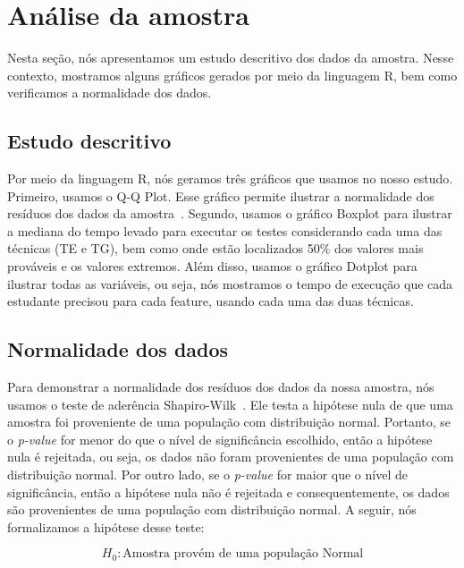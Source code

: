 \section{An\'alise da amostra}
\label{sec:analise}

Nesta seção, nós apresentamos um estudo descritivo dos dados da amostra. Nesse contexto, mostramos alguns gráficos gerados por meio da linguagem R, bem como verificamos a normalidade dos dados.

\subsection{Estudo descritivo}
\label{sec:estudo}

Por meio da linguagem R, nós geramos três gráficos que usamos no nosso estudo. Primeiro, usamos o Q-Q Plot. Esse gráfico permite ilustrar a normalidade dos resíduos dos dados da amostra~\cite{Wilk1968}. Segundo, usamos o gráfico Boxplot para ilustrar a mediana do tempo levado para executar os testes considerando cada uma das técnicas (TE e TG), bem como onde estão localizados 50\% dos valores mais prováveis e os valores extremos. Além disso, usamos o gráfico Dotplot para ilustrar todas as variáveis, ou seja, nós mostramos o tempo de execução que cada estudante precisou para cada feature, usando cada uma das duas técnicas.

\subsection{Normalidade dos dados}
\label{sec:normalidade}

Para demonstrar a normalidade dos resíduos dos dados da nossa amostra, nós usamos o teste de aderência Shapiro-Wilk~\cite{shapirowilk}. Ele testa a hipótese nula de que uma amostra foi proveniente de uma população com distribuição normal. Portanto, se o \emph{p-value} for menor do que o nível de significância escolhido, então a hipótese nula é rejeitada, ou seja, os dados não foram provenientes de uma população com distribuição normal. Por outro lado, se o \emph{p-value} for maior que o nível de significância, então a hipótese nula não é rejeitada e consequentemente, os dados são provenientes de uma população com distribuição normal. A seguir, nós formalizamos a hipótese desse teste:

\footnotesize
\begin{equation}
	H_{0} : \text{Amostra provém de uma população Normal}
\end{equation}

